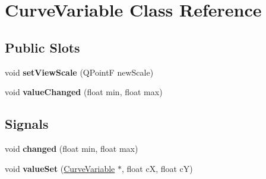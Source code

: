 \hypertarget{class_curve_variable}{
\section{\-Curve\-Variable \-Class \-Reference}
\label{class_curve_variable}
}
\subsection*{\-Public \-Slots}
\begin{DoxyCompactItemize}
\item 
\hypertarget{class_curve_variable_a566b778221b8f31b0c1ad25a75d63347}{
void {\bfseries set\-View\-Scale} (\-Q\-Point\-F new\-Scale)}
\label{class_curve_variable_a566b778221b8f31b0c1ad25a75d63347}

\item 
\hypertarget{class_curve_variable_a57cc50bcc29054da5a77adb27cd5c69e}{
void {\bfseries value\-Changed} (float min, float max)}
\label{class_curve_variable_a57cc50bcc29054da5a77adb27cd5c69e}

\end{DoxyCompactItemize}
\subsection*{\-Signals}
\begin{DoxyCompactItemize}
\item 
\hypertarget{class_curve_variable_a64f381f31bf294326eb80d2b275345b9}{
void {\bfseries changed} (float min, float max)}
\label{class_curve_variable_a64f381f31bf294326eb80d2b275345b9}

\item 
\hypertarget{class_curve_variable_a1d945952195229618ab8eb78206269ed}{
void {\bfseries value\-Set} (\hyperlink{class_curve_variable}{\-Curve\-Variable} $\ast$, float c\-X, float c\-Y)}
\label{class_curve_variable_a1d945952195229618ab8eb78206269ed}

\end{DoxyCompactItemize}
